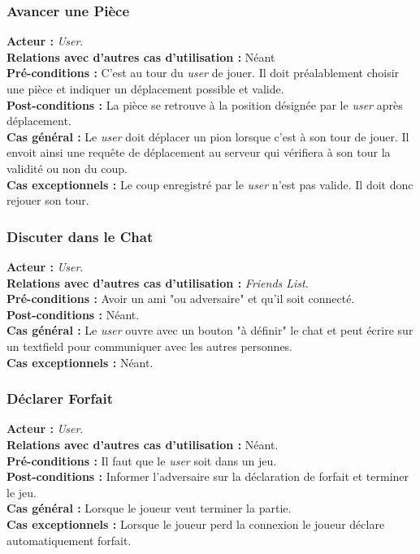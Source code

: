\documentclass[10pt, a4paper]{article}
\begin{document}
\subsubsection{Avancer une Pièce}
\textbf{Acteur :} \textit{User}.\\
\textbf{Relations avec d'autres cas d'utilisation :} Néant \\
\textbf{Pré-conditions :} C'est au tour du \textit{user} de jouer. Il doit préalablement choisir une pièce et indiquer un déplacement possible et valide. \\
\textbf{Post-conditions :} La pièce se retrouve à la position désignée par le \textit{user} après déplacement. \\
\textbf{Cas général :} Le \textit{user} doit déplacer un pion lorsque c'est à son tour de jouer. Il envoit ainsi une requête de déplacement au serveur qui vérifiera à son tour la validité ou non du coup. \\
\textbf{Cas exceptionnels :} Le coup enregistré par le \textit{user} n'est pas valide. Il doit donc rejouer son tour. \\

\subsubsection{Discuter dans le Chat}
\textbf{Acteur :} \textit{User}.\\
\textbf{Relations avec d'autres cas d'utilisation :} \textit{Friends List}.\\
\textbf{Pré-conditions :} Avoir un ami "ou adversaire" et qu'il soit connecté.\\ %
\textbf{Post-conditions :} Néant.\\
\textbf{Cas général :} Le \textit{user} ouvre avec un bouton "à définir" le chat et peut écrire sur un textfield pour communiquer avec les autres personnes.\\ %
\textbf{Cas exceptionnels :} Néant.

\subsubsection{Déclarer Forfait}
\textbf{Acteur :} \textit{User}.\\
\textbf{Relations avec d'autres cas d'utilisation :} Néant.\\
\textbf{Pré-conditions :} Il faut que le \textit{user} soit dans un jeu. \\
\textbf{Post-conditions :} Informer l'adversaire sur la déclaration de forfait et terminer le jeu.\\
\textbf{Cas général :} Lorsque le joueur veut terminer la partie.\\
\textbf{Cas exceptionnels :} Lorsque le joueur perd la connexion le joueur déclare automatiquement forfait. %
\end{document}
